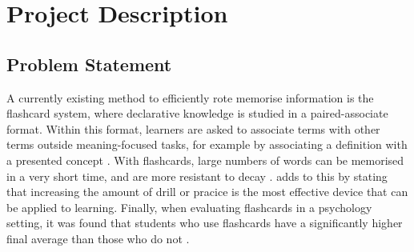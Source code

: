\chapter{Project Description}

\section{Problem Statement}





A currently existing method to efficiently rote memorise information is the flashcard system, where declarative knowledge is studied in a paired-associate format. Within this format, learners are asked to associate terms with other terms outside meaning-focused tasks, for example by associating a definition with a presented concept \cite{nakata}. With flashcards, large numbers of words can be memorised in a very short time, and are more resistant to decay \cite{nakata, joseph}.  adds to this by stating that increasing the amount of drill or pracice is the most effective device that can be applied to learning. Finally, when evaluating flashcards in a psychology setting, it was found that students who use flashcards have a significantly higher final average than those who do not \cite{burgess, golding}.

